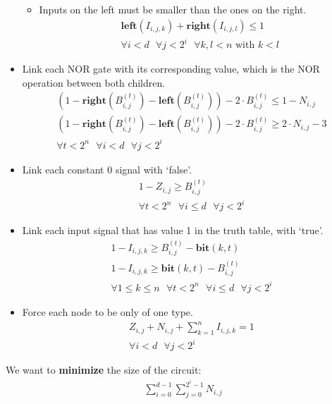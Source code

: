 \documentclass[letterpaper,10pt]{article}
\begin{document}
\begin{itemize}
\begin{itemize}
        \item Inputs on the left must be smaller than the ones on the right.
            \begin{align*}
                \mathbf{left}(I_{i,j,k}) + \mathbf{right}(I_{i,j,l}) \leq 1 \\
                \forall i < d\text{ }\forall j < 2^i\text{ }\forall k,l < n\text{ with }k < l
            \end{align*}
    \end{itemize}
    \item Link each NOR gate with its corresponding value, which is the NOR operation between both children.
    \begin{align*}
        (1 - \mathbf{right}(B_{i,j}^{(t)}) - \mathbf{left}(B_{i,j}^{(t)})) - 2\cdot B_{i,j}^{(t)} \leq 1-N_{i,j} \\
   (1 - \mathbf{right}(B_{i,j}^{(t)}) - \mathbf{left}(B_{i,j}^{(t)})) - 2\cdot B_{i,j}^{(t)} \geq 2 \cdot N_{i,j} - 3 \\
        \forall t < 2^n\text{ }\forall i < d\text{ }\forall j < 2^i
    \end{align*}
    \item Link each constant 0 signal with `false'.
    \begin{align*}
        1 - Z_{i,j} \geq B_{i,j}^{(t)} \\
        \forall t < 2^n\text{ }\forall i \leq d\text{ }\forall j < 2^i
    \end{align*}
    \item Link each input signal that has value 1 in the truth table, with `true'.
    \begin{align*}
        1 - I_{i,j,k} \geq B_{i,j}^{(t)} - \mathbf{bit}(k,t) \\
        1 - I_{i,j,k} \geq \mathbf{bit}(k,t) - B_{i,j}^{(t)} \\
        \forall 1 \leq k \leq n\text{ }\forall t  < 2^n\text{ }\forall i \leq d\text{ }\forall j < 2^i
    \end{align*}
    \item Force each node to be only of one type.
    \begin{align*}
        Z_{i,j} + N_{i,j} + \sum_{k = 1}^n {I_{i,j,k}} = 1\\
        \forall i < d\text{ }\forall j < 2^i
    \end{align*}
\end{itemize}

We want to \textbf{minimize} the size of the circuit:
\begin{align*}
    \sum_{i=0}^{d-1} \sum_{j=0}^{2^i-1} N_{i,j} \\
\end{align*}
\end{document}
